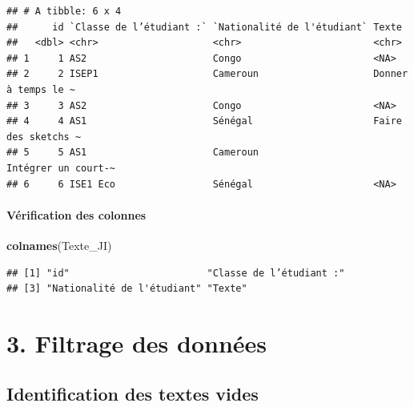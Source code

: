 \documentclass[
]{article}
\newenvironment{Shaded}{\begin{snugshade}}{\end{snugshade}}
\newcommand{\FunctionTok}[1]{\textcolor[rgb]{0.13,0.29,0.53}{\textbf{#1}}}
\newcommand{\NormalTok}[1]{#1}
\begin{document}
\begin{verbatim}
## # A tibble: 6 x 4
##      id `Classe de l’étudiant :` `Nationalité de l'étudiant` Texte              
##   <dbl> <chr>                    <chr>                       <chr>              
## 1     1 AS2                      Congo                       <NA>               
## 2     2 ISEP1                    Cameroun                    Donner à temps le ~
## 3     3 AS2                      Congo                       <NA>               
## 4     4 AS1                      Sénégal                     Faire des sketchs ~
## 5     5 AS1                      Cameroun                    Intégrer un court-~
## 6     6 ISE1 Eco                 Sénégal                     <NA>
\end{verbatim}

\paragraph{Vérification des
colonnes}\label{vuxe9rification-des-colonnes}

\begin{Shaded}
\begin{Highlighting}[]
\FunctionTok{colnames}\NormalTok{(Texte\_JI)}
\end{Highlighting}
\end{Shaded}

\begin{verbatim}
## [1] "id"                        "Classe de l’étudiant :"   
## [3] "Nationalité de l'étudiant" "Texte"
\end{verbatim}

\section{3. Filtrage des données}\label{filtrage-des-donnuxe9es}

\subsection{Identification des textes
vides}\label{identification-des-textes-vides}
\end{document}

